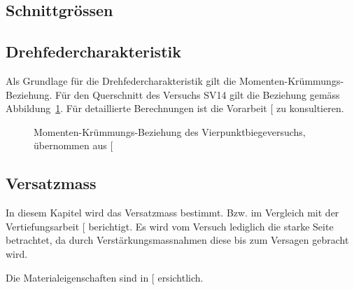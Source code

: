 \documentclass[
  11pt,
  letterpaper,
]{scrreprt}
\begin{document}
\subsection{Schnittgrössen}\label{schnittgruxf6ssen}

\subsection{Drehfedercharakteristik}\label{drehfedercharakteristik}

Als Grundlage für die Drehfedercharakteristik gilt die
Momenten-Krümmungs-Beziehung. Für den Querschnitt des Versuchs SV14 gilt
die Beziehung gemäss Abbildung~\ref{fig-mchi_sv14}. Für detaillierte
Berechnungen ist die Vorarbeit {[}\citeproc{ref-gitz_ansatze_2024}{1}{]}
zu konsultieren.

\begin{figure}[H]


\caption{\label{fig-mchi_sv14}Momenten-Krümmungs-Beziehung des
Vierpunktbiegeversuchs, übernommen aus
{[}\citeproc{ref-gitz_ansatze_2024}{1}{]}}

\end{figure}%

\subsection{Versatzmass}\label{versatzmass}

In diesem Kapitel wird das Versatzmass bestimmt. Bzw. im Vergleich mit
der Vertiefungsarbeit {[}\citeproc{ref-gitz_ansatze_2024}{1}{]}
berichtigt. Es wird vom Versuch lediglich die starke Seite betrachtet,
da durch Verstärkungsmassnahmen diese bis zum Versagen gebracht wird.

Die Materialeigenschaften sind in
{[}\citeproc{ref-marienhutte_produktdatenblatt_b550bpdf_nodate}{4}{]}
ersichtlich.
\end{document}
